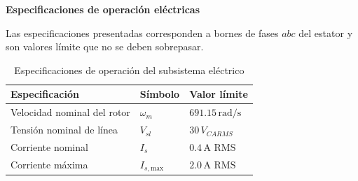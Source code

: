 \documentclass{article}
\begin{document}
\textbf{Especificaciones de operación eléctricas}

Las especificaciones presentadas corresponden a bornes de fases \(abc\) del estator y son valores límite que no se deben sobrepasar.

\begin{table}[H]
\centering
\label{tabla_especificaciones_electricas}
\begin{tabular}{|l|l|l|}
\hline
\textbf{Especificación} & \textbf{Símbolo} & \textbf{Valor límite} \\ \hline
Velocidad nominal del rotor & $\omega_m$ & $691.15 \, \text{rad/s}$ \\ \hline
Tensión nominal de línea & $V_{sl}$ & $30 \, \text{\(V_{CA RMS}\)}$ \\ \hline
Corriente nominal & $I_s$ & $0.4 \, \text{A RMS}$ \\ \hline
Corriente máxima & $I_{s, \text{max}}$ & $2.0 \, \text{A RMS}$ \\ \hline
\end{tabular}
\caption{Especificaciones de operación del subsistema eléctrico}
\label{tabla:especificaciones_operacion_electricas}
\end{table}
\end{document}
